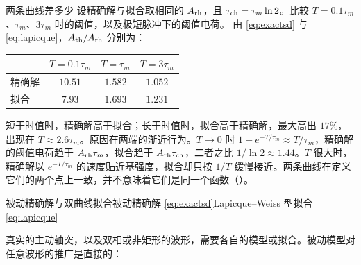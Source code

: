 
\begin{example}[label=ex:neuro-sd]{两条曲线差多少}
设精确解与拟合取相同的 $A_{\rm rh}$，且 $\tau_{\rm ch}=\tau_m\ln2$。比较 $T=0.1\tau_m$、$\tau_m$、$3\tau_m$ 时的阈值，以及极短脉冲下的阈值电荷。
\solution
由 \eqref{eq:exactsd} 与 \eqref{eq:lapicque}，$A_{\rm th}/A_{\rm rh}$ 分别为：
\begin{center}\small
\begin{tabular}{@{}lccc@{}}
\toprule
& $T=0.1\tau_m$ & $T=\tau_m$ & $T=3\tau_m$\\\midrule
精确解 & $10.51$ & $1.582$ & $1.052$\\
拟合 & $7.93$ & $1.693$ & $1.231$\\
\bottomrule
\end{tabular}
\end{center}
短于时值时，精确解高于拟合；长于时值时，拟合高于精确解，最大高出 $17\%$，出现在 $T\approx2.6\tau_m$。原因在两端的渐近行为。$T\to0$ 时 $1-e^{-T/\tau_m}\approx T/\tau_m$，精确解的阈值电荷趋于 $A_{\rm rh}\tau_m$，拟合趋于 $A_{\rm rh}\tau_{\rm ch}$，二者之比 $1/\ln2\approx1.44$。$T$ 很大时，精确解以 $e^{-T/\tau_m}$ 的速度贴近基强度，拟合却只按 $1/T$ 缓慢接近。两条曲线在定义它们的两个点上一致，并不意味着它们是同一个函数（）。
\end{example}

\begin{compare}{被动精确解与双曲线拟合}{被动精确解 \eqref{eq:exactsd}}{Lapicque--Weiss 型拟合 \eqref{eq:lapicque}}
\end{compare}

真实的主动轴突，以及双相或非矩形的波形，需要各自的模型或拟合。被动模型对任意波形的推广是直接的：

